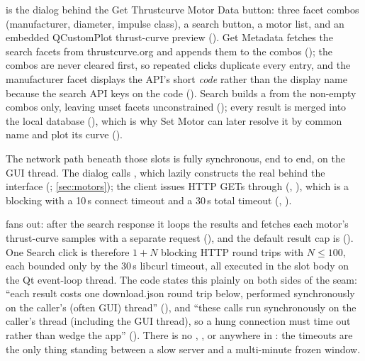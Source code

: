  is the dialog behind the Get Thrustcurve Motor Data button:
three facet combos (manufacturer, diameter, impulse class), a search button, a motor list, and
an embedded QCustomPlot thrust-curve preview
(). Get Metadata fetches the search facets from
thrustcurve.org and appends them to the combos ();
the combos are never cleared first, so repeated clicks duplicate every entry, and the
manufacturer facet displays the API's short \emph{code} rather than the display name because
the search API keys on the code (). Search builds a
 from the non-empty combos only, leaving unset facets unconstrained
(); every result is merged into the local database
(), which is why Set Motor can later resolve it by
common name and plot its curve ().

The network path beneath those slots is fully synchronous, end to end, on the GUI thread.
The dialog calls , which lazily constructs the real
 behind the  interface
(; \cref{sec:motors}); the client issues HTTP GETs
through  (,
), which is a blocking
 with a 10\,s connect timeout and a 30\,s total timeout
(, ).

\begin{keyinsight}
 fans out: after the search response it loops the results and fetches each
motor's thrust-curve samples with a separate  request
(), and the default result cap is
 (). One Search click is therefore
$1 + N$ blocking HTTP round trips with $N \le 100$, each bounded only by the 30\,s libcurl
timeout, all executed in the slot body on the Qt event-loop thread. The code states this
plainly on both sides of the seam: ``each result costs one download.json round trip below,
performed synchronously on the caller's (often GUI) thread''
(), and ``these calls run synchronously on the caller's
thread (including the GUI thread), so a hung connection must time out rather than wedge the
app'' (). There is no ,
, or  anywhere in : the timeouts
are the only thing standing between a slow server and a multi-minute frozen window.
\end{keyinsight}

